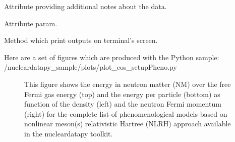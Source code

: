 \documentclass[letterpaper,10pt,english]{sphinxmanual}
\begin{document}
\begin{fulllineitems}

\begin{fulllineitems}
\label{\detokenize{source/api/setup_eos_pheno:nucleardatapy.eos.setup_pheno.setupPheno.note}}
\pysigstartsignatures
{}
\pysigstopsignatures
\sphinxAtStartPar
Attribute providing additional notes about the data.

\end{fulllineitems}


\begin{fulllineitems}
\label{\detokenize{source/api/setup_eos_pheno:nucleardatapy.eos.setup_pheno.setupPheno.param}}
\pysigstartsignatures
{}
\pysigstopsignatures
\sphinxAtStartPar
Attribute param.

\end{fulllineitems}


\begin{fulllineitems}
\label{\detokenize{source/api/setup_eos_pheno:nucleardatapy.eos.setup_pheno.setupPheno.print_outputs}}
\pysigstartsignatures
{}
\pysigstopsignatures
\sphinxAtStartPar
Method which print outputs on terminal’s screen.

\end{fulllineitems}


\end{fulllineitems}


\sphinxAtStartPar
Here are a set of figures which are produced with the Python sample: /nucleardatapy\_sample/plots/plot\_eos\_setupPheno.py

\begin{figure}[htbp]
\centering
\capstart

\noindent{}
\caption{This figure shows the energy in neutron matter (NM) over the free Fermi gas energy (top) and the energy per particle (bottom) as function of the density (left) and the neutron Fermi momentum (right) for the complete list of phenomenological models based on non\sphinxhyphen{}linear meson(s) relativistic Hartree (NLRH) approach available in the nucleardatapy toolkit.}\label{\detokenize{source/api/setup_eos_pheno:id1}}\end{figure}
\end{document}
